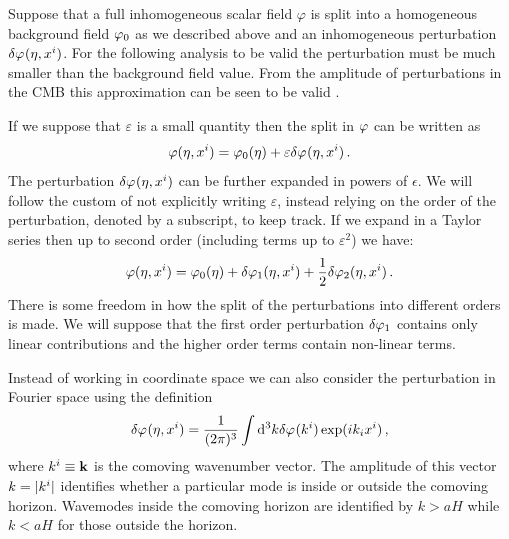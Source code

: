 Suppose that a full inhomogeneous scalar field
$\varphi$ is split into a homogeneous background field $\varphi_0$ as we described
above and an inhomogeneous perturbation $\delta\varphi_{}(\eta,x^i)$. For the following
analysis to be valid the perturbation must be much smaller than the background
field value. From the amplitude of perturbations in the CMB this approximation
can be seen to be valid \cite{Komatsu:2008hk}. 

If we suppose that $\varepsilon$ is a small quantity then the split in $\varphi$
can be written as \cite{Malik:2008im}
% 
\begin{equation}
\label{eq:pertsplit-intro}
\varphi(\eta, x^i) = \varphi_0(\eta) + \varepsilon\delta\varphi_{}(\eta, x^i) \,.
\end{equation}
% 
 The perturbation $\delta\varphi_{}(\eta, x^i)$ can be further expanded in
powers of $\epsilon$.  We will follow the
custom of not explicitly writing $\varepsilon$, instead relying on the order of
the perturbation, denoted by a subscript, to keep track.
If we expand in a Taylor series then up to second order (\ie including terms
up to $\varepsilon^2$) we have:
% 
\begin{equation}
 \varphi(\eta, x^i) = \varphi_0(\eta) + \delta\varphi_{1}(\eta, x^i) + \frac{1}{2}\delta\varphi_{2}(\eta, x^i)
\,.
\end{equation}
% 
There is some freedom in how the split of the perturbations into different
orders is made. We will suppose that the first order perturbation $\delta\varphi_{1}$
contains only linear contributions and the higher order terms contain non-linear
terms. 


Instead of working in coordinate space we can also consider
the perturbation in Fourier space using the definition
% 
\begin{equation}
\label{eq:fourierdefn-intro}
 \delta\varphi_{}(\eta, x^i) = \frac{1}{(2 \pi)^3} \int \mathrm{d}^3k \delta\varphi_{}(k^i) \exp (i k_i
x^i)
\,,
\end{equation}
where $k^i\equiv \textbf{k}$ is the comoving wavenumber vector. The amplitude of this
vector $k=|k^i|$ identifies whether a particular mode is inside or outside
the comoving horizon. Wavemodes inside the comoving horizon are identified by
$k>aH$ while $k<aH$ for those outside the horizon. 


